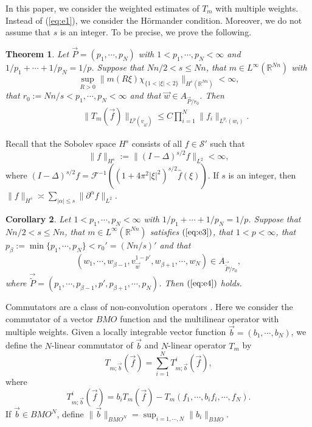 \documentclass[11pt,oneside,onecolumn]{amsart}
\numberwithin{equation}{section}
\newtheorem{Theorem}{Theorem}[section]
\newtheorem{Corollary}[Theorem]{Corollary}
\begin{document}
In this paper, we consider the weighted estimates of $T_m$ with multiple weights. Instead of (\ref{eq:e1}),
we  consider the H\"{o}rmander condition. Moreover, we do not assume that $s$ is an integer. To be precise, we prove the following.
\begin{Theorem}\label{thm:main}
Let $\vec{P}=(p_1,\cdots, p_N)$ with $1< p_1, \cdots, p_N<\infty$ and $1/{p_1}+\cdots+1/{p_N}=1/p$.  Suppose that
$Nn/2< s\le Nn$, that $m\in L^{\infty}({\mathbb{R}}^{Nn})$ with
\begin{equation}\label{eq:e3}
\sup_{R>0}\|m(R\xi)\chi^{}_{\{1<|\xi|<2\}}\|_{H^s({\mathbb{R}}^{Nn})}<\infty,
\end{equation}
that $r_0:=Nn/s<p_1,\cdots,p_N<\infty$ and that $\vec{w}\in A_{\vec{P}/{r_0}}$. Then
\begin{eqnarray}
&& \|T_m(\vec{f})\|_{L^p(v^{}_{\vec{w}})}\le C \prod_{i=1}^N \|f_i\|_{L^{p_i}(w_i)}.\label{eq:e4}
\end{eqnarray}
\end{Theorem}
Recall that the Sobolev space $H^s$ consists of all $f\in\mathscr{S}'$ such that
\[
  \|f\|_{H^s}:=\|(I-\Delta)^{s/2}f\|_{L^2}<\infty,
\]
where $(I-\Delta)^{s/2}f=\mathcal{F}^{-1}((1+4\pi^2 |\xi|^2)^{s/2}\hat{f}(\xi))$. If $s$ is an integer, then
$\|f\|_{H^s}\asymp \sum_{|\alpha|\le s}\|\partial^\alpha f\|_{L^2}$.

\begin{Corollary}\label{cor:c1}
Let $1<p_1, \cdots, p_N<\infty$ with $1/{p_1}+\cdots+1/{p_N}=1/p$. Suppose that
$Nn/2< s\le Nn$, that $m\in L^\infty({\mathbb{R}}^{Nn})$ satisfies $(\ref{eq:e3})$, that $1<p<\infty$, that $p^{}_{\beta}:=\min\{p_1,\cdots,p_N\}<r_0'=(Nn/s)'$ and that
\[
  (w_1,\cdots,w^{}_{\beta-1}, v_{\vec{w}}^{1-p'},w^{}_{\beta+1},\cdots,w_N)\in A_{\vec{\tilde{P}}/{r_0}},
\]
where $\vec{\tilde{P}}=(p_1,\cdots,p^{}_{\beta-1},p',p^{}_{\beta+1},\cdots,p_N)$. Then
$(\ref{eq:e4})$ holds.
\end{Corollary}

Commutators are a class of non-convolution operators \cite{CM1,DGY,G,HMY}.
Here we consider the commutator of a vector $BMO$ function and the multilinear operator with multiple weights. Given a locally
integrable vector function $\vec{b}=(b_1,\cdots, b_N)$, we define the $N$-linear commutator of $\vec{b}$ and
$N$-linear operator $T_m$ by
\[
  T_{m;\vec{b}}(\vec{f})=\sum_{i=1}^NT_{m;\vec{b}}^i(\vec{f}),
\]
where
\[
  T_{m;\vec{b}}^i(\vec{f})=b_iT_m(\vec{f})-T_m(f_1,\cdots,b_if_i,\cdots,f_N).
\]
If $\vec{b}\in BMO^N$, define $\|\vec{b}\|_{BMO^N}=\sup_{i=1,\cdots,N}\|b_i\|_{BMO}$.
\end{document}
